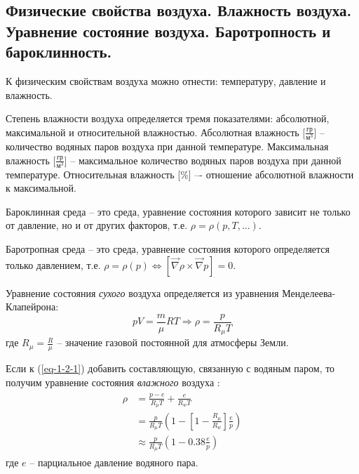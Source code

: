 \subsection{Физические свойства воздуха. Влажность воздуха. Уравнение состояние воздуха. Баротропность и бароклинность.}
К физическим свойствам воздуха можно отнести: температуру, давление и влажность.

Степень влажности воздуха определяется тремя показателями: абсолютной, максимальной и относительной влажностью.
Абсолютная влажность [$\frac{\text{гр}}{\text{м}^{3}}$] -- количество водяных паров воздуха при данной температуре.
Максимальная влажность [$\frac{\text{гр}}{\text{м}^{3}}$] -- максимальное количество водяных паров воздуха при данной температуре.
Относительная влажность [\%] –- отношение абсолютной влажности к максимальной.

Бароклинная среда -- это среда, уравнение состояния которого зависит не только от давление, но и от других факторов, т.е. $\rho=\rho(p, T, ...)$.

Баротропная среда -- это среда, уравнение состояния которого определяется только давлением, т.е. $\rho=\rho(p)\Leftrightarrow\left[\vec{\nabla}\rho\times\vec{\nabla}p\right]=0$.

Уравнение состояния \textit{сухого} воздуха определяется из уравнения Менделеева-Клапейрона:
\begin{equation}\label{eq-1-2-1}
pV=\frac{m}{\mu}RT\Rightarrow \rho=\frac{p}{R_{\mu}T}
\end{equation}
где $R_{\mu}=\frac{R}{\mu}$ -- значение газовой постоянной для атмосферы Земли.

Если к (\ref{eq-1-2-1}) добавить составляющую, связанную с водяным паром, то получим уравнение состояния \textit{влажного} воздуха \cite{Nosov2019-5}:
\begin{align}\label{eq-1-2-2}
\begin{split}
\rho
&=\frac{p-e}{R_{\mu}T}+\frac{e}{R_{w}T}
\\
&=\frac{p}{R_{\mu}T}\left(1-\left[1-\frac{R_{\mu}}{R_{w}}\right]\frac{e}{p}\right)
\\
&\approx\frac{p}{R_{\mu}T}\left(1-0.38\frac{e}{p}\right)
\end{split}
\end{align}
где $e$ -- парциальное давление водяного пара.
